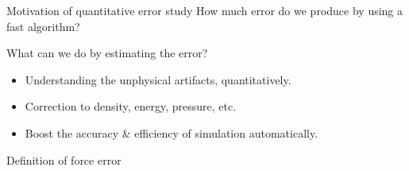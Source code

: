 \documentclass{beamer}
\newcommand{\redc}[1]{{\color{red} #1}}
\newcommand{\bluec}[1]{{\color{blue} #1}}
\newcommand{\vect}[1]{\textbf{\textit{#1}}}
\begin{document}
\begin{frame}{Motivation of quantitative error study}
  \redc{How much error do we produce by using a fast algorithm?}
  \\
  \vskip 1cm
  
  What can we do by estimating the error?
  \begin{itemize}\itemsep 3pt
  \item <2->Understanding
    the unphysical artifacts, quantitatively.
  \item <3->Correction to density, energy, pressure, etc.
  \item <4->Boost the accuracy \& efficiency of simulation automatically.
  \end{itemize}  
  \vfill
\end{frame}



\begin{frame}{Definition of force error}
\end{frame}



\end{document}
